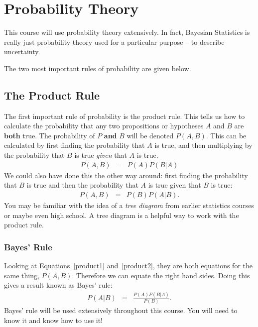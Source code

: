 \chapter{Probability Theory}
This course will use probability theory extensively. In fact, Bayesian
Statistics is really just probability theory used for a particular purpose --
to describe uncertainty.

The two most important rules of probability are given below.

\section{The Product Rule}
The first important rule of probability is the
product rule. This tells us how to calculate the probability that any two
propositions or hypotheses $A$ and $B$ are {\bf both} true.
The probability of $P$ {\bf and}
$B$ will be denoted $P(A, B)$. This can be calculated by first finding the
probability that $A$ is true, and then multiplying by the probability that $B$
is true {\it given} that $A$ is true.
\begin{eqnarray}
P(A, B) &=& P(A)P(B|A)\label{product1}
\end{eqnarray}
We could also have done this the other way around: first finding the
probability that $B$ is true and then the probability that $A$ is true given
that $B$ is true:
\begin{eqnarray}
P(A, B) &=& P(B)P(A|B).\label{product2}
\end{eqnarray}
You may be familiar with the idea of a {\it tree diagram} from earlier
statistics courses or maybe even high school. A tree diagram is a helpful way
to work with the product rule.

\subsection{Bayes' Rule}
Looking at Equations~\ref{product1} and~\ref{product2}, they are both equations
for the same
thing, $P(A,B)$. Therefore we can equate the right hand sides. Doing this gives
a result known as Bayes' rule:
\begin{eqnarray}
P(A|B) &=& \frac{P(A)P(B|A)}{P(B)}. \label{bayes}
\end{eqnarray}
Bayes' rule will be used extensively throughout this course. You will need to
know it and know how to use it!

